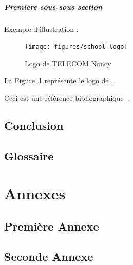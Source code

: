 \documentclass{tnreport}
\begin{document}
\subsubsection{Première sous-sous section}

Exemple d'illustration :

\begin{figure}[h]
  \centering
  \texttt{[image: figures/school-logo]}
  \caption{Logo de TELECOM Nancy}
  \label{fig:logo-tn}
\end{figure}

La Figure~\ref{fig:logo-tn} représente le logo de \reportSchool{}.

Ceci est une référence bibliographique~\cite{GOT4}.

\cleardoublepage

\chapter{Conclusion}

\cleardoublepage
\renewcommand{\tocbibname}{Bibliographie / Webographie}


\cleardoublepage

\listoffigures
\cleardoublepage

\listoftables
\cleardoublepage

\lstlistoflistings
\cleardoublepage

\chapter*{Glossaire}

\cleardoublepage
\renewcommand{\thesubsection}{\Roman{subsection}}

\appendix
\part*{Annexes}
\cleardoublepage

\chapter{Première Annexe}
\cleardoublepage

\chapter{Seconde Annexe}
\end{document}
